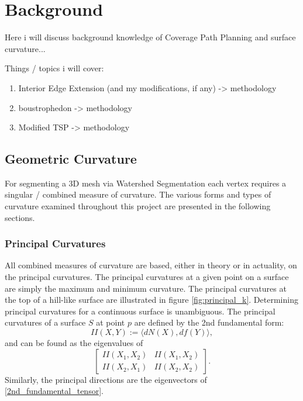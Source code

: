 \chapter{Background}\label{background}
Here i will discuss background knowledge of Coverage Path Planning and surface curvature...

Things / topics i will cover:
\begin{enumerate}
	\item Interior Edge Extension (and my modifications, if any) -> methodology
	\item boustrophedon -> methodology
	\item Modified TSP -> methodology
\end{enumerate}


\section{Geometric Curvature}
For segmenting a 3D mesh via Watershed Segmentation each vertex requires a singular / combined measure of curvature.
The various forms and types of curvature examined throughout this project are presented in the following sections.

\subsection{Principal Curvatures}
All combined measures of curvature are based, either in theory or in actuality, on the principal curvatures.
The principal curvatures at a given point on a surface are simply the maximum and minimum curvature\cite{DDGAppIntro_17_smooth_k}.
The principal curvatures at the top of a hill-like surface are illustrated in figure \ref{fig:principal_k}.
Determining principal curvatures for a continuous surface is unambiguous.
The principal curvatures of a surface $S$ at point $p$ are defined by the 2nd fundamental form\cite{DiffGeo_curves_surfaces, Basic_diff_geo_of_surfaces, DDGAppIntro_17_smooth_k}:
\begin{equation}
	II(X,Y) := \langle dN(X), df(Y)\rangle,
\end{equation}
and can be found as the eigenvalues of
\begin{equation}\label{2nd_fundamental_tensor}
	\begin{bmatrix}
		II(X_1, X_2) & II(X_1, X_2) \\
		II(X_2, X_1) & II(X_2, X_2)
	\end{bmatrix}.
\end{equation}
Similarly, the principal directions are the eigenvectors of \ref{2nd_fundamental_tensor}.

